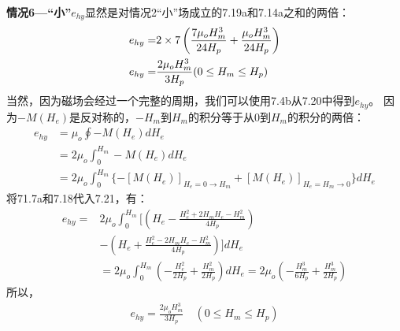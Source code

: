 \textbf{情况6---“小”}\quad $e_{hy}$显然是对情况2“小”场成立的7.19a和7.14a之和的两倍：
\begin{align}%
e_{hy}=&2\times7\left(\frac{7\mu_oH_{m}^{3}}{24H_p}+\frac{\mu_oH_{m}^{3}}{24H_p}\right)\\\notag
e_{hy}=&\frac{2\mu_oH_{m}^{3}}{3H_p}     (0\leq H_m\leq H_p)
\end{align}
当然，因为磁场会经过一个完整的周期，我们可以使用7.4b从7.20中得到$e_{hy}$。
因为$-M(H_e)$是反对称的，$-H_m$到$H_m$的积分等于从0到$H_m$的积分的两倍：
\begin{align*}%
e_{hy}&=\mu_o\oint-M(H_e)dH_e \\
&=2\mu_o\int_{0}^{H_m}-M(H_e)dH_e\\ 
&=2\mu_o\int_{0}^{H_m}\{-[M(H_e)]_{H_e=0\rightarrow H_m}+[M(H_e)]_{H_e=H_m\rightarrow 0}\}dH_e \tag{7.21}
\end{align*}
将71.7a和7.18代入7.21，有：
\begin{align*}%
e_{hy}=&2\mu_o\int_{0}^{H_m}\big[\left(H_e-\frac{H_{e}^{2}+2H_mH_e-H_{m}^{2}}{4H_p}\right) \\
&-\left(H_e+\frac{H_{e}^{2}-2H_mH_e-H_{m}^{2}}{4H_p}\right)\big]dH_e \\
&=2\mu_o\int_{0}^{H_m}\left(-\frac{H_{e}^{2}}{2H_p}+\frac{H_{m}^{2}}{2H_p}\right)dH_e=2\mu_o\left(-\frac{H_{m}^{3}}{6H_p}+\frac{H_{m}^{3}}{2H_p}\right)
\end{align*}
所以，
\begin{align*}
e_{hy}=\frac{2\mu_oH_{m}^{3}}{3H_p} \quad (0\leq H_m\leq H_p) \tag{7.20}
\end{align*}

